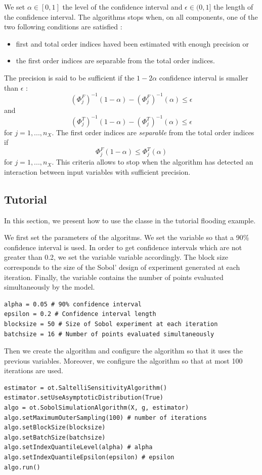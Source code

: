 \documentclass{article}
\begin{document}
We set $\alpha\in[0,1]$ the level of the confidence interval and $\epsilon \in(0,1]$ the length 
of the confidence interval. 
The algorithms stops when, on all components, one of the two 
following conditions are satisfied :
\begin{itemize}
\item first and total order indices haved been estimated with enough precision or 
\item the first order indices are separable from the total order indices. 
\end{itemize}

The precision is said to be sufficient if the $1-2\alpha$ confidence interval is smaller than 
$\epsilon$ :
$$
(\Phi_j^F)^{-1}(1-\alpha) - (\Phi_j^F)^{-1}(\alpha) \leq \epsilon
$$
and 
$$
(\Phi_j^T)^{-1}(1-\alpha) - (\Phi_j^T)^{-1}(\alpha) \leq \epsilon
$$
for $j=1,...,n_X$.  
The first order indices are \emph{separable} from the total order indices if 
$$
\Phi_j^F(1-\alpha) \leq \Phi_j^T(\alpha)
$$
for $j=1,...,n_X$.  
This criteria allows to stop when the algorithm has detected an interaction 
between input variables with sufficient precision. 


\subsection{Tutorial}

In this section, we present how to use the  classe 
in the tutorial flooding example. 


We first set the parameters of the algoritms. 
We set the  variable so that a 90\% confidence interval is used. 
In order to get confidence intervals which are not greater than 0.2, we set 
the variable  variable accordingly. 
The block size corresponds to the size of the Sobol' design of experiment generated 
at each iteration. 
Finally, the  variable contains the number of points evaluated simultaneously 
by the model. 
\begin{lstlisting}
alpha = 0.05 # 90% confidence interval
epsilon = 0.2 # Confidence interval length
blocksize = 50 # Size of Sobol experiment at each iteration
batchsize = 16 # Number of points evaluated simultaneously
\end{lstlisting}

Then we create the algorithm and configure the algorithm so that it 
uses the previous variables. 
Moreover, we configure the algorithm so that at most 100 iterations are used. 
\begin{lstlisting}
estimator = ot.SaltelliSensitivityAlgorithm()
estimator.setUseAsymptoticDistribution(True)
algo = ot.SobolSimulationAlgorithm(X, g, estimator)
algo.setMaximumOuterSampling(100) # number of iterations
algo.setBlockSize(blocksize) 
algo.setBatchSize(batchsize) 
algo.setIndexQuantileLevel(alpha) # alpha
algo.setIndexQuantileEpsilon(epsilon) # epsilon
algo.run()
\end{lstlisting}
\end{document}
